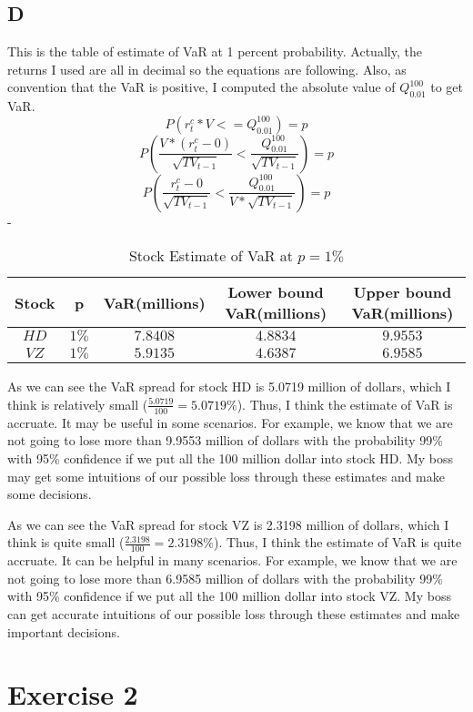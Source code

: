 \documentclass{report}
\begin{document}
\subsection{D}

This is the table of estimate of VaR at 1 percent probability. Actually, the returns I used are all in decimal so the equations are following. Also, as convention that the VaR is positive, I computed the absolute value of $Q_{0.01}^{100}$ to get VaR.
\[ P( r_{t}^{c} * V <= Q_{0.01}^{100}) = p \]
\[ P( \frac{V*(r_{t}^{c} - 0)}{ \sqrt{TV_{t-1}}} < \frac{ Q_{0.01}^{100} }{ \sqrt{TV_{t-1}}} ) = p \]
\[ P( \frac{r_{t}^{c} - 0}{ \sqrt{TV_{t-1}}} < \frac{ Q_{0.01}^{100} }{V *  \sqrt{TV_{t-1}}} ) = p \]-
\begin{table}[H]
\centering
\begin{tabular}{|c|c|c|c|c|}
\hline
Stock&p&VaR(millions)&Lower bound VaR(millions)&Upper bound VaR(millions)\\
\hline
$HD$& $1\%$ & $7.8408$ & $4.8834$&$9.9553$\\
\hline
$VZ$& $1\%$ & $5.9135$ & $4.6387$&$6.9585$\\
\hline
\end{tabular}
\caption{ Stock Estimate of VaR at $ p = 1\%$}
\end{table}
As we can see the VaR spread for stock HD is 5.0719 million of dollars, which I think is relatively small ($ \frac{5.0719}{100} = 5.0719\% $). Thus, I think the estimate of VaR is accruate. It may be useful in some scenarios. For example, we know that we are not going to lose more than 9.9553 million of dollars with the probability 99\% with 95\% confidence if we put all the 100 million dollar into stock HD. My boss may get some intuitions of our possible loss through these estimates and make some decisions.

As we can see the VaR spread for stock VZ is 2.3198 million of dollars, which I think is quite small ($ \frac{2.3198}{100} = 2.3198\% $). Thus, I think the estimate of VaR is quite accruate. It can be helpful in many scenarios. For example, we know that we are not going to lose more than 6.9585 million of dollars with the probability 99\% with 95\% confidence if we put all the 100 million dollar into stock VZ. My boss can get accurate intuitions of our possible loss through these estimates and make important decisions.

\section{Exercise 2}
\end{document}
